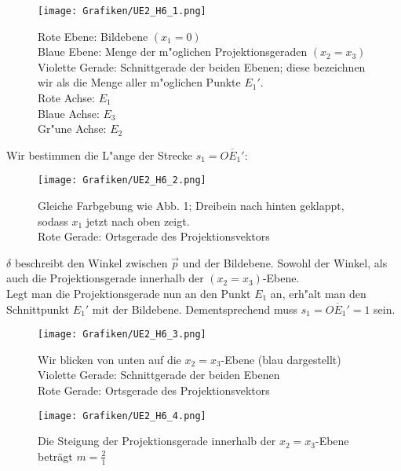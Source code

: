 \begin{Loesung}
\begin{figure}[H]
	\centering
	\texttt{[image: Grafiken/UE2\_H6\_1.png]}
	\caption{
		Rote Ebene: Bildebene \ensuremath{(x_1 = 0)}\\
		Blaue Ebene: Menge der m"oglichen Projektionsgeraden \ensuremath{(x_2 = x_3)}\\
		Violette Gerade: Schnittgerade der beiden Ebenen; diese bezeichnen wir als die Menge aller m"oglichen Punkte \ensuremath{E_1'}.\\
		Rote Achse: \ensuremath{E_1}\\
		Blaue Achse: \ensuremath{E_3}\\
		Gr"une Achse: \ensuremath{E_2}\\
		}
		\label{fig.H6}
\end{figure} 
\begin{Teilloesungen}
Wir bestimmen die L"ange der Strecke $s_1 = \overline{OE_1'}$:
\begin{figure}[H]
	\centering
	\texttt{[image: Grafiken/UE2\_H6\_2.png]}
	\caption{Gleiche Farbgebung wie Abb. 1; Dreibein nach hinten geklappt, sodass \ensuremath{x_1} jetzt nach oben zeigt.\\
	Rote Gerade: Ortsgerade des Projektionsvektors}		
	\label{fig.H6_2}
\end{figure}
\ensuremath{\delta} beschreibt den Winkel zwischen \ensuremath{\overrightarrow{p}} und der Bildebene. Sowohl der 	Winkel, als auch die Projektionsgerade innerhalb der \ensuremath{(x_2 = x_3)}-Ebene. \\		
		Legt man die Projektionsgerade nun an den Punkt \ensuremath{E_1} an, erh"alt man den Schnittpunkt \ensuremath{E_1'} mit der Bildebene. Dementsprechend muss \ensuremath{s_1 = \overline{OE_1'} = 1} sein.
\begin{figure}[H]
	\centering
	\texttt{[image: Grafiken/UE2\_H6\_3.png]}
	\caption{
	Wir blicken von unten auf die \ensuremath{x_2 = x_3}-Ebene (blau dargestellt) \\
	Violette Gerade: Schnittgerade der beiden Ebenen \\
	Rote Gerade: Ortsgerade des Projektionsvektors}
	\label{fig.H6_3}
\end{figure} 

\item \begin{figure}[H]
	\centering
	\texttt{[image: Grafiken/UE2\_H6\_4.png]}
	\caption{Die Steigung der Projektionsgerade innerhalb der \ensuremath{x_2 = x_3}-Ebene beträgt \ensuremath{m = \frac{2}{1}}}
\end{figure} 


\end{Teilloesungen}
\end{Loesung}
